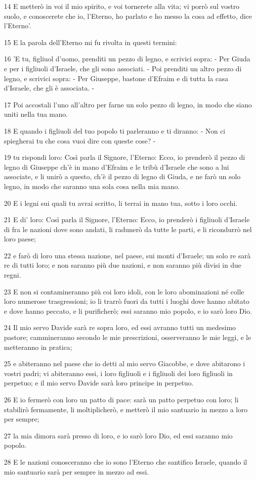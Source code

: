 \par 14 E metterò in voi il mio spirito, e voi tornerete alla vita; vi porrò sul vostro suolo, e conoscerete che io, l'Eterno, ho parlato e ho messo la cosa ad effetto, dice l'Eterno'.
\par 15 E la parola dell'Eterno mi fu rivolta in questi termini:
\par 16 'E tu, figliuol d'uomo, prenditi un pezzo di legno, e scrivici sopra: - Per Giuda e per i figliuoli d'Israele, che gli sono associati. - Poi prenditi un altro pezzo di legno, e scrivici sopra: - Per Giuseppe, bastone d'Efraim e di tutta la casa d'Israele, che gli è associata. -
\par 17 Poi accostali l'uno all'altro per farne un solo pezzo di legno, in modo che siano uniti nella tua mano.
\par 18 E quando i figliuoli del tuo popolo ti parleranno e ti diranno: - Non ci spiegherai tu che cosa vuoi dire con queste cose? -
\par 19 tu rispondi loro: Così parla il Signore, l'Eterno: Ecco, io prenderò il pezzo di legno di Giuseppe ch'è in mano d'Efraim e le tribù d'Israele che sono a lui associate, e li unirò a questo, ch'è il pezzo di legno di Giuda, e ne farò un solo legno, in modo che saranno una sola cosa nella mia mano.
\par 20 E i legni sui quali tu avrai scritto, li terrai in mano tua, sotto i loro occhi.
\par 21 E di' loro: Così parla il Signore, l'Eterno: Ecco, io prenderò i figliuoli d'Israele di fra le nazioni dove sono andati, li radunerò da tutte le parti, e li ricondurrò nel loro paese;
\par 22 e farò di loro una stessa nazione, nel paese, sui monti d'Israele; un solo re sarà re di tutti loro; e non saranno più due nazioni, e non saranno più divisi in due regni.
\par 23 E non si contamineranno più coi loro idoli, con le loro abominazioni né colle loro numerose trasgressioni; io li trarrò fuori da tutti i luoghi dove hanno abitato e dove hanno peccato, e li purificherò; essi saranno mio popolo, e io sarò loro Dio.
\par 24 Il mio servo Davide sarà re sopra loro, ed essi avranno tutti un medesimo pastore; cammineranno secondo le mie prescrizioni, osserveranno le mie leggi, e le metteranno in pratica;
\par 25 e abiteranno nel paese che io detti al mio servo Giacobbe, e dove abitarono i vostri padri; vi abiteranno essi, i loro figliuoli e i figliuoli dei loro figliuoli in perpetuo; e il mio servo Davide sarà loro principe in perpetuo.
\par 26 E io fermerò con loro un patto di pace: sarà un patto perpetuo con loro; li stabilirò fermamente, li moltiplicherò, e metterò il mio santuario in mezzo a loro per sempre;
\par 27 la mia dimora sarà presso di loro, e io sarò loro Dio, ed essi saranno mio popolo.
\par 28 E le nazioni conosceranno che io sono l'Eterno che santifico Israele, quando il mio santuario sarà per sempre in mezzo ad essi.

